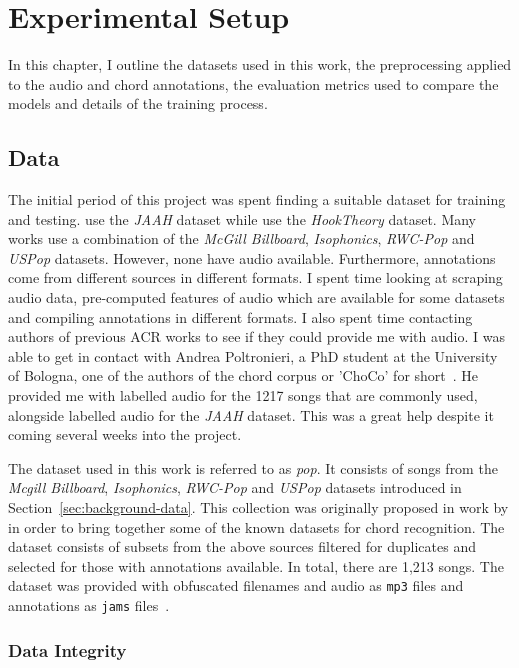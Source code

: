 \chapter{Experimental Setup}

In this chapter, I outline the datasets used in this work, the preprocessing applied to the audio and chord annotations, the evaluation metrics used to compare the models and details of the training process.

\section{Data}

The initial period of this project was spent finding a suitable dataset for training and testing. \citet{JAAH} use the \emph{JAAH} dataset while \citet{MelodyTranscriptionViaGenerativePreTraining} use the \emph{HookTheory} dataset. Many works use a combination of the \emph{McGill Billboard}, \emph{Isophonics}, \emph{RWC-Pop} and \emph{USPop} datasets. However, none have audio available. Furthermore, annotations come from different sources in different formats. I spent time looking at scraping audio data, pre-computed features of audio which are available for some datasets and compiling annotations in different formats. I also spent time contacting authors of previous ACR works to see if they could provide me with audio. I was able to get in contact with Andrea Poltronieri, a PhD student at the University of Bologna, one of the authors of the chord corpus or 'ChoCo' for short~\citep{Choco}. He provided me with labelled audio for the 1217 songs that are commonly used, alongside labelled audio for the \emph{JAAH} dataset. This was a great help despite it coming several weeks into the project.

The dataset used in this work is referred to as \emph{pop}. It consists of songs from the \emph{Mcgill Billboard}, \emph{Isophonics}, \emph{RWC-Pop} and \emph{USPop} datasets introduced in Section~\ref{sec:background-data}. This collection was originally proposed in work by \citet{FourTimelyInsights} in order to bring together some of the known datasets for chord recognition. The dataset consists of subsets from the above sources filtered for duplicates and selected for those with annotations available. In total, there are 1,213 songs. The dataset was provided with obfuscated filenames and audio as \texttt{mp3} files and annotations as \texttt{jams} files~\citep{JAMS}. 

\newpage
\subsection{Data Integrity}\label{sec:data-integrity}

